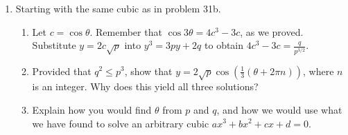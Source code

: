 \documentclass[../gatm.tex]{subfiles}
\begin{document}
\begin{enumerate}
\begin{enumerate}
\end{enumerate}
\item Starting with the same cubic as in problem 31b.
\begin{enumerate}
\item Let $c=\cos\theta$. Remember that $\cos 3\theta=4c^3-3c$, as we proved. Substitute $y=2c\sqrt{p}$ into $y^3=3py+2q$ to obtain $4c^3-3c=\frac{q}{p^{3/2}}$.
\item Provided that $q^2\leq p^3$, show that $y=2\sqrt{p}\cos\left(\frac{1}{3}(\theta+2\pi n)\right)$, where $n$ is an integer. Why does this yield all three solutions?
\item Explain how you would find $\theta$ from $p$ and $q$, and how we would use what we have found to solve an arbitrary cubic $ax^3+bx^2+cx+d=0$.
\end{enumerate}
\end{enumerate}
\end{document}
